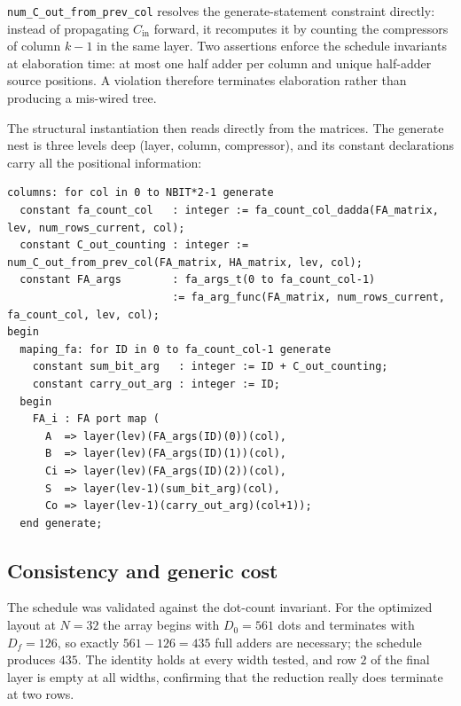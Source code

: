 \documentclass[11pt,a4paper]{article}
\begin{document}
\texttt{num\_C\_out\_from\_prev\_col} resolves the generate-statement constraint
directly: instead of propagating $C_{\mathrm{in}}$ forward, it recomputes it by
counting the compressors of column $k-1$ in the same layer. Two assertions
enforce the schedule invariants at elaboration time: at most one half adder
per column and unique half-adder source positions. A violation therefore
terminates elaboration rather than producing a mis-wired tree.

The structural instantiation then reads directly from the matrices. The generate
nest is three levels deep (layer, column, compressor), and its constant
declarations carry all the positional information:

\begin{lstlisting}[style=vhdl]
columns: for col in 0 to NBIT*2-1 generate
  constant fa_count_col   : integer := fa_count_col_dadda(FA_matrix, lev, num_rows_current, col);
  constant C_out_counting : integer := num_C_out_from_prev_col(FA_matrix, HA_matrix, lev, col);
  constant FA_args        : fa_args_t(0 to fa_count_col-1)
                          := fa_arg_func(FA_matrix, num_rows_current, fa_count_col, lev, col);
begin
  maping_fa: for ID in 0 to fa_count_col-1 generate
    constant sum_bit_arg   : integer := ID + C_out_counting;
    constant carry_out_arg : integer := ID;
  begin
    FA_i : FA port map (
      A  => layer(lev)(FA_args(ID)(0))(col),
      B  => layer(lev)(FA_args(ID)(1))(col),
      Ci => layer(lev)(FA_args(ID)(2))(col),
      S  => layer(lev-1)(sum_bit_arg)(col),
      Co => layer(lev-1)(carry_out_arg)(col+1));
  end generate;
\end{lstlisting}

\subsection{Consistency and generic cost}
\label{sec:ddcheck}

The schedule was validated against the dot-count invariant. For the optimized
layout at $N=32$ the array begins with $D_0 = 561$ dots and terminates with
$D_f = 126$, so exactly $561 - 126 = 435$ full adders are necessary; the
schedule produces $435$. The identity holds at every width tested, and row $2$
of the final layer is empty at all widths, confirming that the reduction really
does terminate at two rows.
\end{document}
